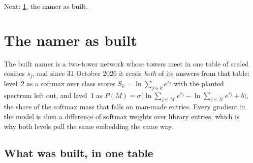\documentclass[11pt,a4paper,oneside,openany]{book}
\newcommand{\nextchapter}[1]{\par\medskip\noindent\hfill\textsf{\small Next: #1}\par}
\begin{document}
\nextchapter{\cref{ch:asbuilt}, the namer as built.}

\chapter{The namer as built}
\label{ch:asbuilt}

\begin{onething}
The built namer is a two-tower network whose towers meet in one table of scaled cosines $s_j$, and since 31 October 2026 it reads \emph{both} of its answers from that
table: level~2 as a softmax over class scores $S_k=\ln\sum_{j\in k}e^{s_j}$ with the planted spectrum left out, and level~1 as
$P(M)=\sigma\big(\ln\sum_{j\in\mathcal M}e^{s_j}-\ln\sum_{j\in\mathcal N}e^{s_j}+b\big)$, the share of the softmax mass that falls on man-made entries. Every gradient in the
model is then a difference of softmax weights over library entries, which is why both levels pull the same embedding the same way.
\end{onething}

\section{What was built, in one table}
\end{document}
